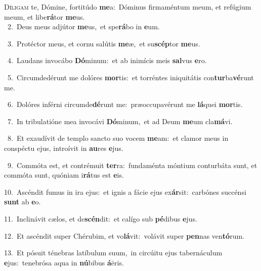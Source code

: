 \lettrine{\initial\textcolor{\initialcolor}{D}}{íligam} te, Dómine, fortitúdo \textbf{me}\-a:~\star Dóminus firmaméntum meum, et refúgium meum, et libe\-\textbf{rá}\-tor \textbf{me}\-us.\\
{\numbfont\textcolor{\numbcolor}{~2.}}~Deus meus adjútor \textbf{me}\-us,~\star et spe\-\textbf{rá}\-bo in \textbf{e}\-um.\par
{\numbfont\textcolor{\numbcolor}{~3.}}~Protéctor meus, et cornu salútis \textbf{me}\-æ,~\star et su\-\textbf{scép}\-tor \textbf{me}\-us.\par
{\numbfont\textcolor{\numbcolor}{~4.}}~Laudans invocábo \textbf{Dó}\-minum:~\star et ab inimícis meis \textbf{sal}\-vus \textbf{e}\-ro.\par
{\numbfont\textcolor{\numbcolor}{~5.}}~Circumdedérunt me dolóres \textbf{mor}\-tis:~\star et torréntes iniquitátis con\-\textbf{tur}\-ba\-\textbf{vé}\-runt me.\par
{\numbfont\textcolor{\numbcolor}{~6.}}~Dolóres inférni circumde\-\textbf{dé}\-runt me:~\star præoccupavérunt me \textbf{lá}\-quei \textbf{mor}\-tis.\par
{\numbfont\textcolor{\numbcolor}{~7.}}~In tribulatióne mea invocávi \textbf{Dó}\-minum,~\star et ad Deum \textbf{me}\-um cla\-\textbf{má}\-vi.\par
{\numbfont\textcolor{\numbcolor}{~8.}}~Et exaudívit de templo sancto suo vocem \textbf{me}\-am:~\star et clamor meus in conspéctu ejus, introívit in \textbf{au}\-res \textbf{e}\-jus.\par
{\numbfont\textcolor{\numbcolor}{~9.}}~Commóta est, et contrémuit \textbf{ter}\-ra:~\star fundaménta móntium conturbáta sunt, et commóta sunt, quóniam i\-\textbf{rá}\-tus est \textbf{e}\-is.\par
{\numbfont\textcolor{\numbcolor}{10.}}~Ascéndit fumus in ira ejus:~\dagger et ignis a fácie ejus ex\-\textbf{ár}\-sit:~\star carbónes succénsi \textbf{sunt} ab \textbf{e}\-o.\par
{\numbfont\textcolor{\numbcolor}{11.}}~Inclinávit cælos, et de\-\textbf{scén}\-dit:~\star et calígo sub \textbf{pé}\-dibus \textbf{e}\-jus.\par
{\numbfont\textcolor{\numbcolor}{12.}}~Et ascéndit super Chérubim, et vo\-\textbf{lá}\-vit:~\star volávit super \textbf{pen}\-nas ven\-\textbf{tó}\-rum.\par
{\numbfont\textcolor{\numbcolor}{13.}}~Et pósuit ténebras latíbulum suum,~\dagger in circúitu ejus tabernáculum \textbf{e}\-jus:~\star tenebrósa aqua in \textbf{nú}\-bibus \textbf{á}\-ëris.\par

